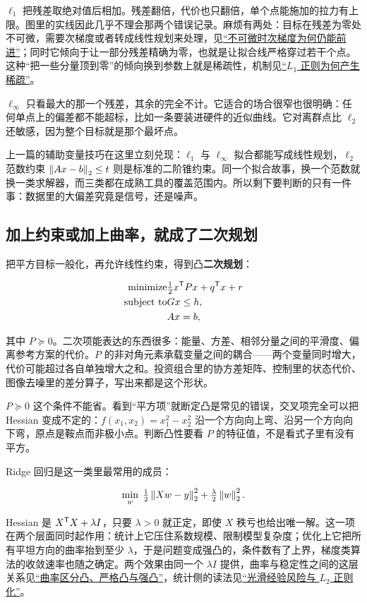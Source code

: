 \(\ell_1\) 把残差取绝对值后相加。残差翻倍，代价也只翻倍，单个点能施加的拉力有上限。图里的实线因此几乎不理会那两个错误记录。麻烦有两处：目标在残差为零处不可微，需要次梯度或者转成线性规划来处理，见\hyperref[sec:09-Convex-Optimization/06-Optimization-Algorithms/03]{``不可微时次梯度为何仍能前进''}；同时它倾向于让一部分残差精确为零，也就是让拟合线严格穿过若干个点。这种``把一些分量顶到零''的倾向换到参数上就是稀疏性，机制见\hyperref[sec:09-Convex-Optimization/07-Applications/02]{``\(L_1\) 正则为何产生稀疏''}。

\(\ell_\infty\) 只看最大的那一个残差，其余的完全不计。它适合的场合很窄也很明确：任何单点上的偏差都不能超标，比如一条要装进硬件的近似曲线。它对离群点比 \(\ell_2\) 还敏感，因为整个目标就是那个最坏点。

上一篇的辅助变量技巧在这里立刻兑现：\(\ell_1\) 与 \(\ell_\infty\) 拟合都能写成线性规划，\(\ell_2\) 范数约束 \(\left\lVert Ax-b\right\rVert_2\le t\) 则是标准的二阶锥约束。同一个拟合故事，换一个范数就换一类求解器，而三类都在成熟工具的覆盖范围内。所以剩下要判断的只有一件事：数据里的大偏差究竟是信号，还是噪声。

\subsection{加上约束或加上曲率，就成了二次规划}

把平方目标一般化，再允许线性约束，得到凸\textbf{二次规划}：

\[
\begin{aligned}
\text{minimize}\space&\tfrac12x^{\mathsf{T}}Px+q^{\mathsf{T}}x+r\\
\text{subject to}\space&Gx\le h,\\
&Ax=b,
\end{aligned}
\]

其中 \(P\succeq0\)。二次项能表达的东西很多：能量、方差、相邻分量之间的平滑度、偏离参考方案的代价。\(P\) 的非对角元素承载变量之间的耦合——两个变量同时增大，代价可能超过各自单独增大之和。投资组合里的协方差矩阵、控制里的状态代价、图像去噪里的差分算子，写出来都是这个形状。

\(P\succeq0\) 这个条件不能省。看到``平方项''就断定凸是常见的错误，交叉项完全可以把 Hessian 变成不定的：\(f(x_1,x_2)=x_1^2-x_2^2\) 沿一个方向向上弯、沿另一个方向向下弯，原点是鞍点而非极小点。判断凸性要看 \(P\) 的特征值，不是看式子里有没有平方。

Ridge 回归是这一类里最常用的成员：

\[
\min_w\;\tfrac12\left\lVert Xw-y\right\rVert_2^2+\tfrac{\lambda}{2}\left\lVert w\right\rVert_2^2 .
\]

Hessian 是 \(X^{\mathsf{T}}X+\lambda I\)，只要 \(\lambda>0\) 就正定，即使 \(X\) 秩亏也给出唯一解。这一项在两个层面同时起作用：统计上它压住系数规模、限制模型复杂度；优化上它把所有平坦方向的曲率抬到至少 \(\lambda\)，于是问题变成强凸的，条件数有了上界，梯度类算法的收敛速率也随之确定。两个效果由同一个 \(\lambda I\) 提供，曲率与稳定性之间的这层关系见\hyperref[sec:09-Convex-Optimization/03-Convex-Functions/03]{``曲率区分凸、严格凸与强凸''}，统计侧的读法见\hyperref[sec:09-Convex-Optimization/07-Applications/01]{``光滑经验风险与 \(L_2\) 正则化''}。


